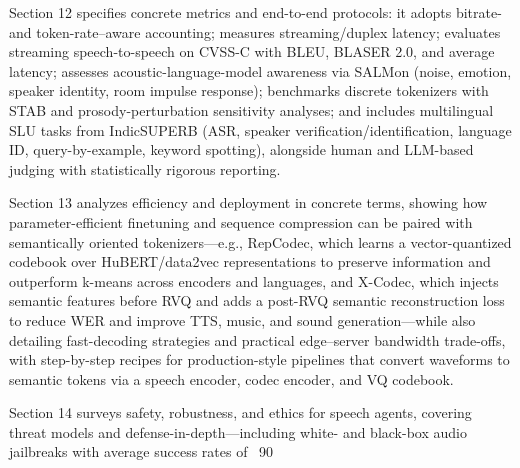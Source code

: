 \documentclass{article}
\begin{document}
Section 12 specifies concrete metrics and end-to-end protocols: it adopts bitrate- and token-rate--aware accounting; measures streaming/duplex latency; evaluates streaming speech-to-speech on CVSS-C with BLEU, BLASER 2.0, and average latency; assesses acoustic-language-model awareness via SALMon (noise, emotion, speaker identity, room impulse response); benchmarks discrete tokenizers with STAB and prosody-perturbation sensitivity analyses; and includes multilingual SLU tasks from IndicSUPERB (ASR, speaker verification/identification, language ID, query-by-example, keyword spotting), alongside human and LLM-based judging with statistically rigorous reporting. \cite{onda2025benchmarkingprosodyencodingdiscretespeec,vashishth2024stabspeechtokenizerassessmentbenchmark,entry2025indicsuperbspeechprocessinguniversalperf,maimon2025salmonsuiteacousticlanguagemodelevaluati,zhao2024textlessstreamingspeechtranslationsemant} 



Section 13 analyzes efficiency and deployment in concrete terms, showing how parameter-efficient finetuning and sequence compression can be paired with semantically oriented tokenizers---e.g., RepCodec, which learns a vector-quantized codebook over HuBERT/data2vec representations to preserve information and outperform k-means across encoders and languages, and X-Codec, which injects semantic features before RVQ and adds a post-RVQ semantic reconstruction loss to reduce WER and improve TTS, music, and sound generation---while also detailing fast-decoding strategies and practical edge--server bandwidth trade-offs, with step-by-step recipes for production-style pipelines that convert waveforms to semantic tokens via a speech encoder, codec encoder, and VQ codebook. \cite{ye2024codecdoesmatterexploringsemanticshortcom,huang2024repcodecspeechrepresentationcodectokeniz} 



Section 14 surveys safety, robustness, and ethics for speech agents, covering threat models and defense-in-depth---including white- and black-box audio jailbreaks with average success rates of ~90%
\end{document}
